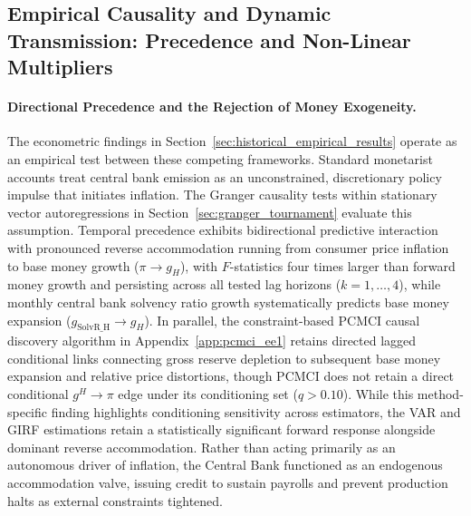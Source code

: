\subsection{Empirical Causality and Dynamic Transmission: Precedence and Non-Linear Multipliers}
\label{sec:causality_transmission}

\paragraph{Directional Precedence and the Rejection of Money Exogeneity.}
The econometric findings in Section~\ref{sec:historical_empirical_results} operate as an empirical test between these competing frameworks. Standard monetarist accounts treat central bank emission as an unconstrained, discretionary policy impulse that initiates inflation. The Granger causality tests within stationary vector autoregressions in Section~\ref{sec:granger_tournament} evaluate this assumption. Temporal precedence exhibits bidirectional predictive interaction with pronounced reverse accommodation running from consumer price inflation to base money growth ($\pi \to g_H$), with $F$-statistics four times larger than forward money growth and persisting across all tested lag horizons ($k=1,\dots,4$), while monthly central bank solvency ratio growth systematically predicts base money expansion ($g_{\text{SolvR\_H}} \to g_H$). In parallel, the constraint-based PCMCI causal discovery algorithm in Appendix~\ref{app:pcmci_ee1} retains directed lagged conditional links connecting gross reserve depletion to subsequent base money expansion and relative price distortions, though PCMCI does not retain a direct conditional $g^H \to \pi$ edge under its conditioning set ($q > 0.10$). While this method-specific finding highlights conditioning sensitivity across estimators, the VAR and GIRF estimations retain a statistically significant forward response alongside dominant reverse accommodation. Rather than acting primarily as an autonomous driver of inflation, the Central Bank functioned as an endogenous accommodation valve, issuing credit to sustain payrolls and prevent production halts as external constraints tightened.


